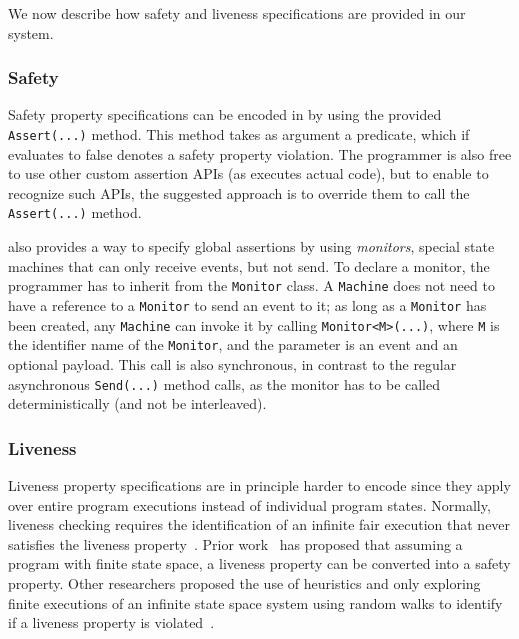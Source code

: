 We now describe how safety and liveness specifications are provided in our system.

\subsubsection{Safety}
\label{sec:psharp:safety}

Safety property specifications can be encoded in \psharp by using the provided \texttt{Assert(...)} method. This method takes as argument a predicate, which if evaluates to false denotes a safety property violation. The programmer is also free to use other custom assertion APIs (as \psharp executes actual code), but to enable \psharp to recognize such APIs, the suggested approach is to override them to call the \psharp \texttt{Assert(...)} method.

\psharp also provides a way to specify global assertions by using \emph{monitors}, special state machines that
can only receive events, but not send. To declare a monitor, the programmer has to inherit from the \psharp \texttt{Monitor} class. A \texttt{Machine} does not need to have a reference to a \texttt{Monitor} to send an event to it; as long as a \texttt{Monitor} has been created, any \texttt{Machine} can invoke it by calling \texttt{Monitor<M>(...)}, where \texttt{M} is the identifier name of the \texttt{Monitor}, and the parameter is an event and an optional payload. This call is also synchronous, in contrast to the regular asynchronous \texttt{Send(...)} method calls, as the monitor has to be called deterministically (and not be interleaved).

\subsubsection{Liveness}
\label{sec:psharp:liveness}

Liveness property specifications are in principle harder to encode since they apply over entire program executions instead of individual program states. Normally, liveness checking requires the identification of an infinite fair execution that never satisfies the liveness property~\cite{schuppan2004efficient, musuvathi2008fair}. Prior work~\cite{schuppan2004efficient} has proposed that assuming a program with finite state space, a liveness property can be converted into a safety property. Other researchers proposed the use of heuristics and only exploring finite executions of an infinite state space system using random walks to identify if a liveness property is violated~\cite{killian2007life}.

